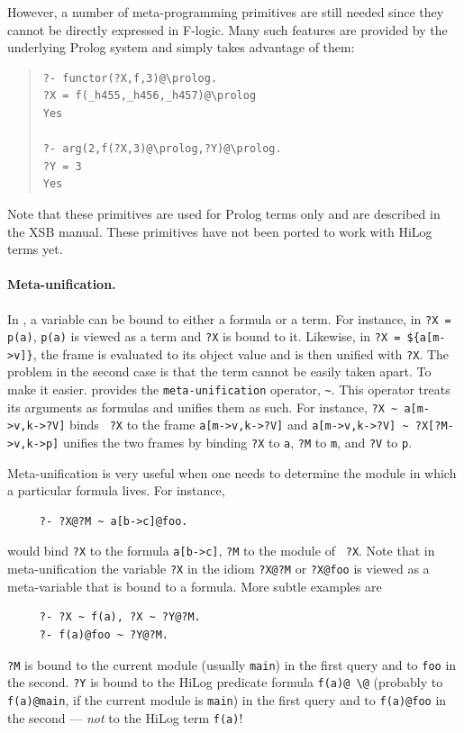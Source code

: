 \documentclass[11pt]{article}
\newcommand{\ERGO}{\mbox{\smaller{\ensuremath{\cal{E}}\smaller{{\sc{RGO}}}}}\xspace}
\newcommand{\FLSYSTEM}{\ERGO}
\newcommand{\bs}{\textbackslash}
\newcommand{\fl}{\mbox{F-logic}\xspace}
\begin{document}
However, a number of meta-programming primitives are still needed
since they cannot be directly expressed in \fl. Many such features are
provided by the underlying Prolog system and \FLSYSTEM simply takes advantage of
them: 
\begin{quote}
\begin{verbatim}
?- functor(?X,f,3)@\prolog.
?X = f(_h455,_h456,_h457)@\prolog
Yes

?- arg(2,f(?X,3)@\prolog,?Y)@\prolog.
?Y = 3
Yes
\end{verbatim}
\end{quote}
Note that these primitives are used for Prolog terms only and
are described in the XSB manual. These primitives have not been ported to
work with HiLog terms yet.

\paragraph{Meta-unification.}
In \FLSYSTEM, a variable can be bound to either a formula or a term. For instance,
in {\tt ?X = p(a)}, {\tt p(a)} is viewed as a term and {\tt ?X} is bound to
it. Likewise, in {\tt ?X = \$\{a[m->v]\}}, the frame is evaluated to its
object value and is then unified with {\tt ?X}.
The problem in the second case is that the term cannot be easily taken
apart.
To make it easier.
\FLSYSTEM provides the {\tt meta-unification}
operator, \verb|~|.  This operator treats its arguments as formulas and
unifies them as such. For instance, {\tt ?X \verb|~| a[m->v,k->?V]} binds {\tt
  ?X} to the frame {\tt a[m->v,k->?V]} and {\tt a[m->v,k->?V] \verb|~|
  ?X[?M->v,k->p]} unifies the two frames by binding {\tt ?X} to {\tt a},
{\tt ?M} to {\tt m}, and {\tt ?V} to {\tt p}.

Meta-unification is very useful when one needs to determine the module
in which a particular formula lives. For instance,
\begin{verbatim}
     ?- ?X@?M ~ a[b->c]@foo.  
\end{verbatim}
would bind {\tt ?X} to the formula {\tt a[b->c]},  {\tt ?M} to the module of {\tt
?X}. Note that in meta-unification the variable {\tt ?X} in the idiom
\verb|?X@?M| or \verb|?X@foo| is viewed as a meta-variable that is bound to
a formula.  More subtle examples are
\begin{verbatim}
     ?- ?X ~ f(a), ?X ~ ?Y@?M.  
     ?- f(a)@foo ~ ?Y@?M.
\end{verbatim}
{\tt ?M} is bound to the current module (usually \texttt{main})
in the first query and to {\tt foo} in the
second. {\tt ?Y} is bound to the
HiLog predicate
formula {\tt f(a)@\,\bs{}@} (probably to \texttt{f(a)@main}, if the current
module is \texttt{main})
in the first query and to {\tt f(a)@foo} in
the second --- \emph{not} to the HiLog term {\tt f(a)}!
\end{document}
